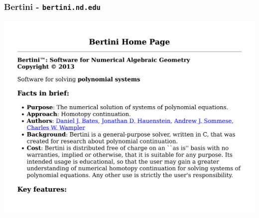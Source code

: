 \documentclass{beamer}
\begin{document}
\begin{frame}[fragile]
\frametitle{Bertini - {\tt bertini.nd.edu}}
\includegraphics[page=1, clip, trim=0in 1.5in 0in 0in, width=\textwidth]{bertini.nd.edu.pdf}
\end{frame}
\end{document}
